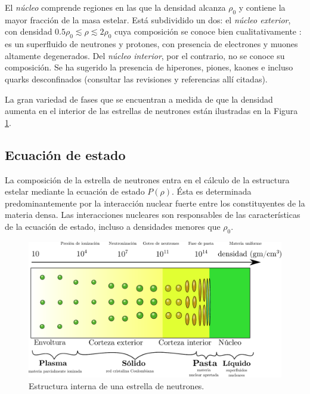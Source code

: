 El \emph{núcleo} comprende regiones en las que la densidad alcanza $\rho_0$ y contiene la mayor fracción de la masa estelar. Está subdividido un dos: el \emph{núcleo exterior}, con densidad $\num{0.5}\rho_0\lesssim\rho\lesssim 2\rho_0$  cuya composición se conoce bien cualitativamente \cite{Haensel2007NeutronStructure}: es un superfluido de neutrones y protones, con presencia de electrones y muones altamente degenerados. Del \emph{núcleo interior}, por el contrario, no se conoce su composición. Se ha sugerido la presencia de hiperones, piones, kaones e incluso quarks desconfinados (consultar las revisiones \cite{Lattimer2004,Potekhin} y referencias allí citadas).



La gran variedad de fases que se encuentran a medida de que la densidad aumenta en el interior de las estrellas de neutrones están ilustradas en la Figura \ref{NSS}. 

   



\subsection{Ecuación de estado}

La composición de la estrella de neutrones entra en el cálculo de la estructura estelar mediante la ecuación de estado $P(\rho)$. Ésta es determinada predominantemente por la interacción nuclear fuerte entre los constituyentes de la materia densa. Las interacciones nucleares son responsables de las características de la ecuación de estado, incluso a densidades menores que $\rho_0$. 

\begin{figure}[H]
    \centering
    \includegraphics[width=420pt]{figures/Density.pdf}
    \caption[Estructura interna de una estrella de neutrones]{Estructura interna de una estrella de neutrones.\protect\footnotemark}
    \label{NSS}
\end{figure}

